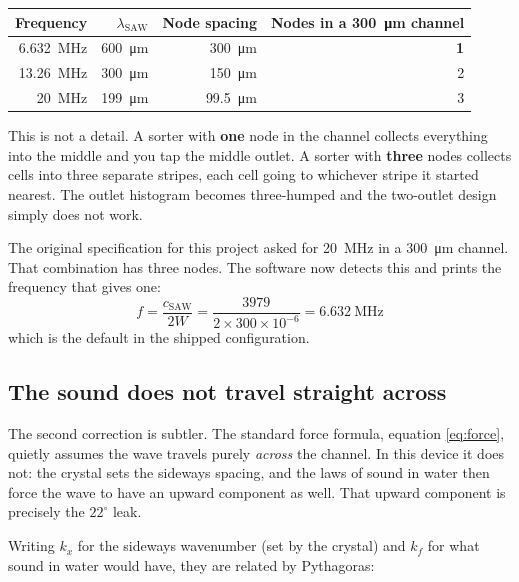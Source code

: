 \documentclass[11pt,a4paper]{article}
\begin{document}
\begin{center}\small
\begin{tabular}{rrrr}
\toprule
\textbf{Frequency} & \textbf{$\lambda_{\text{SAW}}$} & \textbf{Node spacing} &
\textbf{Nodes in a \SI{300}{\micro\meter} channel} \\
\midrule
\SI{6.632}{\mega\hertz} & \SI{600}{\micro\meter} & \SI{300}{\micro\meter} & \textbf{1} \\
\SI{13.26}{\mega\hertz} & \SI{300}{\micro\meter} & \SI{150}{\micro\meter} & 2 \\
\SI{20}{\mega\hertz}    & \SI{199}{\micro\meter} & \SI{99.5}{\micro\meter} & 3 \\
\bottomrule
\end{tabular}
\end{center}

\begin{warnbox}
This is not a detail. A sorter with \textbf{one} node in the channel collects
everything into the middle and you tap the middle outlet. A sorter with
\textbf{three} nodes collects cells into three separate stripes, each cell going
to whichever stripe it started nearest. The outlet histogram becomes
three-humped and the two-outlet design simply does not work.

The original specification for this project asked for \SI{20}{\mega\hertz} in a
\SI{300}{\micro\meter} channel. That combination has three nodes. The software
now detects this and prints the frequency that gives one:
\[
f = \frac{c_{\text{SAW}}}{2W} = \frac{3979}{2\times300\times10^{-6}}
  = \SI{6.632}{\mega\hertz}
\]
which is the default in the shipped configuration.
\end{warnbox}

\subsection{The sound does not travel straight across}

The second correction is subtler. The standard force formula, equation
\eqref{eq:force}, quietly assumes the wave travels purely \emph{across} the
channel. In this device it does not: the crystal sets the sideways spacing, and
the laws of sound in water then force the wave to have an upward component as
well. That upward component is precisely the $22^\circ$ leak.

Writing $k_x$ for the sideways wavenumber (set by the crystal) and $k_f$ for
what sound in water would have, they are related by Pythagoras:
\end{document}
